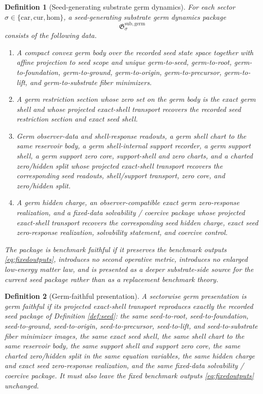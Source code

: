 \documentclass[11pt]{article}
\newcommand{\Car}{\mathrm{car}}
\newcommand{\Cur}{\mathrm{cur}}
\newcommand{\Hom}{\mathrm{hom}}
\newcommand{\GermPackage}{\mathfrak G^{\mathrm{sub,germ}}}
\newtheorem{definition}{Definition}
\begin{document}
\begin{definition}[Seed-generating substrate germ dynamics]
\label{def:germ}
For each sector \(\sigma\in\{\Car,\Cur,\Hom\}\), a \emph{seed-generating substrate germ dynamics package}
\[
\GermPackage_{\sigma}
\]
consists of the following data.
\begin{enumerate}
    \item A compact convex germ body over the recorded seed state space together with affine projection to seed scope and unique germ-to-seed, germ-to-root, germ-to-foundation, germ-to-ground, germ-to-origin, germ-to-precursor, germ-to-lift, and germ-to-substrate fiber minimizers.
    \item A germ restriction section whose zero set on the germ body is the exact germ shell and whose projected exact-shell transport recovers the recorded seed restriction section and exact seed shell.
    \item Germ observer-data and shell-response readouts, a germ shell chart to the same reservoir body, a germ shell-internal support recorder, a germ support shell, a germ support zero core, support-shell and zero charts, and a charted zero/hidden split whose projected exact-shell transport recovers the corresponding seed readouts, shell/support transport, zero core, and zero/hidden split.
    \item A germ hidden charge, an observer-compatible exact germ zero-response realization, and a fixed-data solvability / coercive package whose projected exact-shell transport recovers the corresponding seed hidden charge, exact seed zero-response realization, solvability statement, and coercive control.
\end{enumerate}
The package is \emph{benchmark faithful} if it preserves the benchmark outputs \eqref{eq:fixedoutputs}, introduces no second operative metric, introduces no enlarged low-energy matter law, and is presented as a deeper substrate-side source for the current seed package rather than as a replacement benchmark theory.
\end{definition}

\begin{definition}[Germ-faithful presentation]
\label{def:faithful}
A sectorwise germ presentation is \emph{germ faithful} if its projected exact-shell transport reproduces exactly the recorded seed package of Definition \ref{def:seed}: the same seed-to-root, seed-to-foundation, seed-to-ground, seed-to-origin, seed-to-precursor, seed-to-lift, and seed-to-substrate fiber minimizer images, the same exact seed shell, the same shell chart to the same reservoir body, the same support shell and support zero core, the same charted zero/hidden split in the same equation variables, the same hidden charge and exact seed zero-response realization, and the same fixed-data solvability / coercive package. It must also leave the fixed benchmark outputs \eqref{eq:fixedoutputs} unchanged.
\end{definition}
\end{document}
